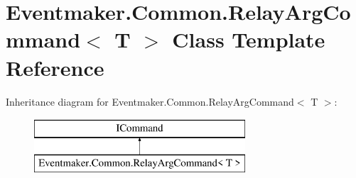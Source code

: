 \hypertarget{class_eventmaker_1_1_common_1_1_relay_arg_command}{}\section{Eventmaker.\+Common.\+Relay\+Arg\+Command$<$ T $>$ Class Template Reference}
\label{class_eventmaker_1_1_common_1_1_relay_arg_command}
Inheritance diagram for Eventmaker.\+Common.\+Relay\+Arg\+Command$<$ T $>$\+:\begin{figure}[H]
\begin{center}
\leavevmode
\includegraphics[height=2.000000cm]{class_eventmaker_1_1_common_1_1_relay_arg_command}
\end{center}
\end{figure}
